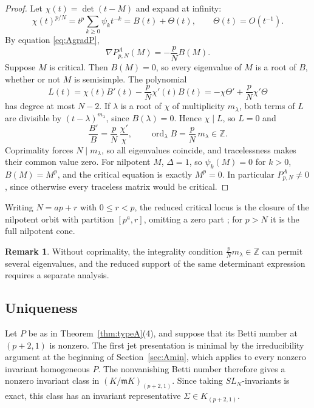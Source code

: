 \documentclass[10pt,reqno]{amsart}
\numberwithin{equation}{section}
\theoremstyle{plain}
\theoremstyle{definition}
\newtheorem{remark}[theorem]{Remark}
\begin{document}
\begin{proof}
Let $\chi(t)=\det(t-M)$ and expand at infinity:
\begin{equation*}
\chi(t)^{p/N}=t^p\sum_{k\ge0}\psi_kt^{-k}=B(t)+\Theta(t),\qquad \Theta(t)=O(t^{-1}).
\end{equation*}
By equation \eqref{eq:AgradP}, 
\begin{equation*}
    \nabla P^A_{p,N}(M)=-\frac pNB(M) .
\end{equation*}
Suppose $M$ is critical. Then $B(M)=0$, so every eigenvalue of $M$ is a root of $B$, whether or not $M$ is semisimple. The polynomial
\begin{equation*}
	L(t)=\chi(t)B'(t)-\frac pN\chi'(t)B(t)=-\chi\Theta'+\frac pN\chi'\Theta
\end{equation*}
has degree at most $N-2$. If $\lambda$ is a root of $\chi$ of multiplicity $m_\lambda$, both terms of $L$ are divisible by $(t-\lambda)^{m_\lambda}$, since $B(\lambda)=0$. Hence $\chi\mid L$, so $L=0$ and
\begin{equation*}
	\frac{B'}B=\frac pN\,\frac{\chi'}\chi,\qquad \operatorname{ord}_\lambda B=\frac pN\,m_\lambda\in\mathbb{Z} .
\end{equation*}
Coprimality forces $N\mid m_\lambda$, so all eigenvalues coincide, and tracelessness makes their common value zero. For nilpotent $M$, $\Delta=1$, so $\psi_k(M)=0$ for $k>0$, $B(M)=M^p$, and the critical equation is exactly $M^p=0$. In particular $P^A_{p,N}\neq0$, since otherwise every traceless matrix would be critical.
\end{proof}

Writing $N=ap+r$ with $0\le r<p$, the reduced critical locus is the closure of the nilpotent orbit with partition $[p^a,r]$, omitting a zero part \cite{CM}; for $p>N$ it is the full nilpotent cone.

\begin{remark}\label{rem:coprime}
Without coprimality, the integrality condition $\tfrac pNm_\lambda\in\mathbb{Z}$ can permit several eigenvalues, and the reduced support of the same determinant expression requires a separate analysis.
\end{remark}

\subsection{Uniqueness}

Let $P$ be as in Theorem~\ref{thm:typeA}(4), and suppose that its Betti number at $(p+2,1)$ is nonzero. The first jet presentation is minimal by the irreducibility argument at the beginning of Section~\ref{sec:Amin}, which applies to every nonzero invariant homogeneous $P$. The nonvanishing Betti number therefore gives a nonzero invariant class in $(K/\mathfrak mK)_{(p+2,1)}$. Since taking $SL_N$-invariants is exact, this class has an invariant representative $\Sigma\in K_{(p+2,1)}$.
\end{document}
